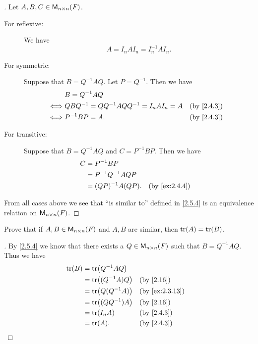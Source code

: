 \begin{proof}[]
	Let \(A, B, C \in \ms[n][n][\F]\).
	\begin{description}
		\item[For reflexive:]
			We have
			\[
				A = I_n A I_n = I_n^{-1} A I_n.
			\]
		\item[For symmetric:]
			Suppose that \(B = Q^{-1} A Q\).
			Let \(P = Q^{-1}\).
			Then we have
			\begin{align*}
				     & B = Q^{-1} A Q                                                   \\
				\iff & Q B Q^{-1} = Q Q^{-1} A Q Q^{-1} = I_n A I_n = A &  & \by{2.4.3} \\
				\iff & P^{-1} B P = A.                                  &  & \by{2.4.3}
			\end{align*}
		\item[For transitive:]
			Suppose that \(B = Q^{-1} A Q\) and \(C = P^{-1} B P\).
			Then we have
			\begin{align*}
				C & = P^{-1} B P                             \\
				  & = P^{-1} Q^{-1} A Q P                    \\
				  & = (QP)^{-1} A (QP).   &  & \by{ex:2.4.4}
			\end{align*}
	\end{description}
	From all cases above we see that ``is similar to'' defined in \cref{2.5.4} is an equivalence relation on \(\ms[n][n][\F]\).
\end{proof}

\begin{ex}\label{ex:2.5.10}
	Prove that if \(A, B \in \ms[n][n][\F]\) and \(A, B\) are similar, then \(\tr[A] = \tr[B]\).
\end{ex}

\begin{proof}[]
	By \cref{2.5.4} we know that there exists a \(Q \in \ms[n][n][\F]\) such that \(B = Q^{-1} A Q\).
	Thus we have
	\begin{align*}
		\tr[B] & = \tr[Q^{-1} A Q]                       \\
		       & = \tr[(Q^{-1} A) Q] &  & \by{2.16}      \\
		       & = \tr[Q (Q^{-1} A)] &  & \by{ex:2.3.13} \\
		       & = \tr[(Q Q^{-1}) A] &  & \by{2.16}      \\
		       & = \tr[I_n A]        &  & \by{2.4.3}     \\
		       & = \tr[A].           &  & \by{2.4.3}
	\end{align*}
\end{proof}

